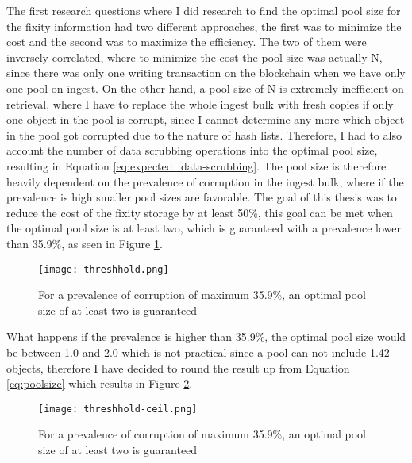 The first research questions where I did research to find the optimal pool size for the fixity information had two different approaches, the first was to minimize the cost and the second was to maximize the efficiency. The two of them were inversely correlated, where to minimize the cost the pool size was actually N, since there was only one writing transaction on the blockchain when we have only one pool on ingest. On the other hand, a pool size of N is extremely inefficient on retrieval, where I have to replace the whole ingest bulk with fresh copies if only one object in the pool is corrupt, since I cannot determine any more which object in the pool got corrupted due to the nature of hash lists. Therefore, I had to also account the number of data scrubbing operations into the optimal pool size, resulting in Equation \ref{eq:expected_data-scrubbing}. The pool size is therefore heavily dependent on the prevalence of corruption in the ingest bulk, where if the prevalence is high smaller pool sizes are favorable. The goal of this thesis was to reduce the cost of the fixity storage by at least 50\%, this goal can be met when the optimal pool size is at least two, which is guaranteed with a prevalence lower than 35.9\%, as seen in Figure \ref{fig:threshhold}.
\begin{figure}[h]
    \caption{For a prevalence of corruption of maximum 35.9\%, an optimal pool size of at least two is guaranteed}
    \label{fig:threshhold}
    \centering
    \texttt{[image: threshhold.png]}
\end{figure}
What happens if the prevalence is higher than 35.9\%, the optimal pool size would be between 1.0 and 2.0 which is not practical since a pool can not include 1.42 objects, therefore I have decided to round the result up from Equation \ref{eq:poolsize} which results in Figure \ref{fig:threshhold-ceil}.
\begin{figure}[h]
    \caption{For a prevalence of corruption of maximum 35.9\%, an optimal pool size of at least two is guaranteed}
    \label{fig:threshhold-ceil}
    \centering
    \texttt{[image: threshhold-ceil.png]}
\end{figure}
